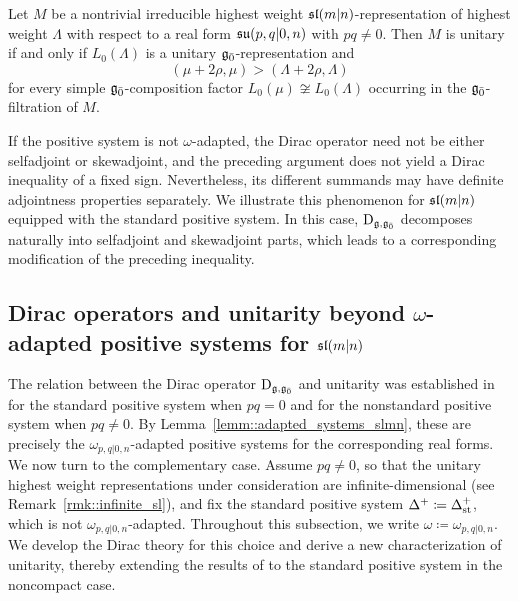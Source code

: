 \begin{theorem}
\label{thm::unitarity_via_Dirac_inequality}
Let $M$ be a nontrivial irreducible highest weight $\sl(m\vert n)$-representation
of highest weight $\Lambda$ with respect to a real form $\su(p,q\vert 0,n)$ with $pq\neq 0$. Then $M$ is unitary if and only if
$L_0(\Lambda)$ is a unitary $\even$-representation and
\begin{equation*}
 (\mu+2\rho,\mu)
 >
 (\Lambda+2\rho,\Lambda)
\end{equation*}
for every simple $\even$-composition factor $L_0(\mu)\not\cong
L_0(\Lambda)$ occurring in the $\even$-filtration of $M$.
\end{theorem}

If the positive system is not $\omega$-adapted, the Dirac operator need
not be either selfadjoint or skewadjoint, and the preceding argument does
not yield a Dirac inequality of a fixed sign. Nevertheless, its different
summands may have definite adjointness properties separately. We illustrate
this phenomenon for $\sl(m\vert n)$ equipped with the standard positive
system. In this case, $\Dirac_{\gg,\even}$ decomposes naturally into
selfadjoint and skewadjoint parts, which leads to a corresponding
modification of the preceding inequality.




\subsection{Dirac operators and unitarity beyond \texorpdfstring{$\omega$}{omega}-adapted positive systems for \texorpdfstring{$\slmn$}{sl(m|n)}}\label{subsec::Dirac_unitarity_slmn}
The relation between the Dirac operator $\Dirac_{\gg,\even}$ and unitarity was established in \cite{SchmidtDirac} for the standard positive system when $pq=0$ and for the nonstandard positive system when $pq\neq0$. By Lemma~\ref{lemm::adapted_systems_slmn}, these are precisely the $\omega_{p,q\vert 0,n}$-adapted positive systems for the corresponding real forms. We now turn to the complementary case. Assume $pq\neq0$, so that the unitary highest weight representations under consideration are infinite-dimensional (see Remark~\ref{rmk::infinite_sl}), and fix the standard positive system $\Delta^{+}\coloneqq\Delta_{\st}^{+}$, which is not $\omega_{p,q\vert 0,n}$-adapted. Throughout this subsection, we write $\omega\coloneqq\omega_{p,q\vert 0,n}$. We develop the Dirac theory for this choice and derive a new characterization of unitarity, thereby extending the results of \cite{SchmidtDirac} to the standard positive system in the noncompact case. 

